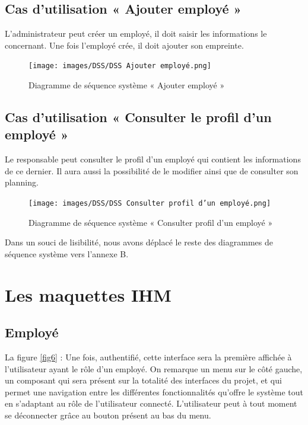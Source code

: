 \subsection{Cas d'utilisation « Ajouter employé »}
L'administrateur peut créer un employé, il doit saisir les informations le
concernant. Une fois l’employé crée, il doit ajouter son empreinte.   

\clearpage
\begin{figure}[h!]
     \centering
    \texttt{[image: images/DSS/DSS Ajouter employé.png]}
     \caption{Diagramme de séquence système « Ajouter employé »}
     \label{fig4}
\end{figure}

\subsection{Cas d'utilisation « Consulter le profil d'un employé »}
Le responsable peut consulter le profil d’un employé qui contient les
informations de ce dernier. Il aura aussi la possibilité de le modifier ainsi
que de consulter son planning.

\clearpage
\begin{figure}[h!]
     \centering
    \texttt{[image: images/DSS/DSS Consulter profil d'un employé.png]}
     \caption{Diagramme de séquence système « Consulter profil d'un employé »}
     \label{fig4}
\end{figure}

Dans un souci de lisibilité, nous avons déplacé le reste des diagrammes de
séquence système vers l’annexe B.  
    
\section{Les maquettes IHM }
\vspace{-5pt}    
\subsection{Employé}
La figure \ref{fig6} : Une fois, authentifié, cette interface sera la première
affichée à l’utilisateur ayant le rôle d’un employé. On remarque un menu sur le
côté gauche, un composant qui sera présent sur la totalité des interfaces du
projet, et qui permet une navigation entre les différentes fonctionnalités
qu’offre le système tout en s’adaptant au rôle de l’utilisateur connecté.
L’utilisateur peut à tout moment se déconnecter grâce au bouton présent au bas
du menu.

